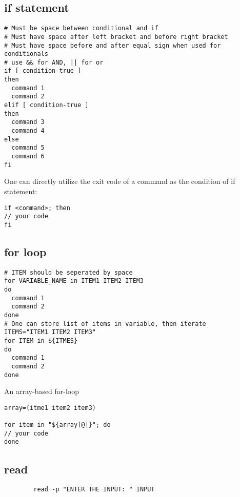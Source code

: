 \documentclass[12pt,a4paper]{article}
\begin{document}
\subsection{if statement}
\begin{footnotesize}
\begin{verbatim}
# Must be space between conditional and if
# Must have space after left bracket and before right bracket
# Must have space before and after equal sign when used for conditionals
# use && for AND, || for or
if [ condition-true ]
then
  command 1
  command 2
elif [ condition-true ]
then
  command 3
  command 4
else
  command 5
  command 6
fi
\end{verbatim}
\end{footnotesize}
One can directly utilize the exit code of a command as the condition of if statement:
\begin{footnotesize}
\begin{verbatim}
if <command>; then
// your code
fi
\end{verbatim}
\end{footnotesize}
\subsection{for loop}
\begin{footnotesize}
\begin{verbatim}
# ITEM should be seperated by space
for VARIABLE_NAME in ITEM1 ITEM2 ITEM3
do
  command 1
  command 2
done
# One can store list of items in variable, then iterate
ITEMS="ITEM1 ITEM2 ITEM3"
for ITEM in ${ITMES}
do
  command 1
  command 2
done
\end{verbatim}
\end{footnotesize}
An array-based for-loop
\begin{footnotesize}
\begin{verbatim}
array=(itme1 item2 item3)

for item in "${array[@]}"; do
// your code
done
\end{verbatim}
\end{footnotesize}

\subsection{read}
\begin{footnotesize}
	\begin{verbatim}
		read -p "ENTER THE INPUT: " INPUT
	\end{verbatim}
\end{footnotesize}
\end{document}
